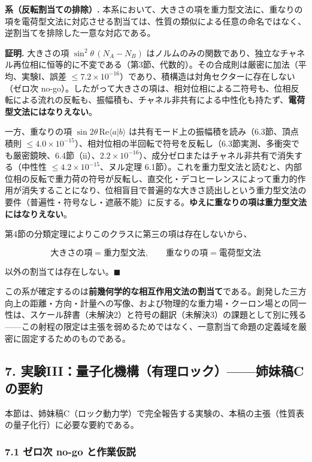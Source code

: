 \documentclass[
  a4paper,
]{ltjsarticle}
\begin{document}
\textbf{系（反転割当ての排除）.}
本系において、大きさの項を重力型文法に、重なりの項を電荷型文法に対応させる割当ては、性質の類似による任意の命名ではなく、逆割当てを排除した一意な対応である。

\textbf{証明.} 大きさの項 \(\sin^2\theta\,(N_A-N_B)\)
はノルムのみの関数であり、独立なチャネル再位相に恒等的に不変である（第3節、代数的）。その合成則は厳密に加法（平均、実験I、誤差
\(\le7.2\times10^{-16}\)）であり、積構造は対角セクターに存在しない（ゼロ次
no-go）。したがって大きさの項は、相対位相による二符号も、位相反転による流れの反転も、振幅積も、チャネル非共有による中性化も持たず、\textbf{電荷型文法にはなりえない}。

一方、重なりの項 \(\sin2\theta\,\mathrm{Re}\langle a|b\rangle\)
は共有モード上の振幅積を読み（6.3節、頂点積則
\(\le4.0\times10^{-15}\)）、相対位相の半回転で符号を反転し（6.3節実測、多衝突でも厳密鏡映、6.4節（ii）、\(2.2\times10^{-16}\)）、成分ゼロまたはチャネル非共有で消失する（中性性
\(\le4.2\times10^{-15}\)、ヌル定理
6.1節）。これを重力型文法と読むと、内部位相の反転で重力荷の符号が反転し、直交化・デコヒーレンスによって重力的作用が消失することになり、位相盲目で普遍的な大きさ読出しという重力型文法の要件（普遍性・符号なし・遮蔽不能）に反する。\textbf{ゆえに重なりの項は重力型文法にはなりえない}。

第4節の分類定理によりこのクラスに第三の項は存在しないから、

\[
\boxed{\text{大きさの項}=\text{重力型文法},\qquad \text{重なりの項}=\text{電荷型文法}}
\]

以外の割当ては存在しない。\(\blacksquare\)

この系が確定するのは\textbf{前幾何学的な相互作用文法の割当て}である。創発した三方向上の距離・方向・計量への写像、および物理的な重力場・クーロン場との同一性は、スケール辞書（未解決2）と符号の翻訳（未解決3）の課題として別に残る------この射程の限定は主張を弱めるためではなく、一意割当て命題の定義域を厳密に固定するためのものである。

\subsection{7.
実験III：量子化機構（有理ロック）------姉妹稿Cの要約}\label{ux5b9fux9a13iiiux91cfux5b50ux5316ux6a5fux69cbux6709ux7406ux30edux30c3ux30afux59c9ux59b9ux7a3fcux306eux8981ux7d04}

本節は、姉妹稿C（ロック動力学）で完全報告する実験の、本稿の主張（性質表の量子化行）に必要な要約である。

\subsubsection{7.1 ゼロ次 no-go
と作業仮説}\label{ux30bcux30edux6b21-no-go-ux3068ux4f5cux696dux4eeeux8aac}
\end{document}
